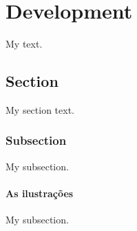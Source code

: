 \chapter{Development}\label{cap:desenvolvimento}
My text.

\section{Section}
My section text.


\subsection{Subsection}

My subsection.

\subsubsection{As ilustrações}

My subsection.